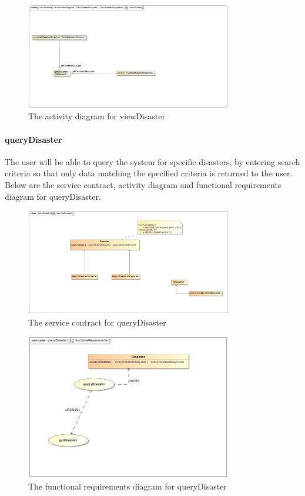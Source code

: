 \begin{figure}[ht!]
\centering
\includegraphics[width=90mm]{../images/viewDisasterActivityDiagram.jpg}
\caption{The activity diagram for viewDisaster \label{overflow}}
\end{figure}

\paragraph{queryDisaster}

The user will be able to query the system for specific disasters, by entering search criteria so that only data matching the specified criteria is returned to the user. Below are the service contract, activity diagram and functional requirements diagram for queryDisaster.

 \begin{figure}[ht!]
	\centering
	\includegraphics[width=90mm]{../images/queryDisasterServiceContract.jpg}
	\caption{The service contract for queryDisaster \label{overflow}}
\end{figure}

\begin{figure}[ht!]
\centering
\includegraphics[width=90mm]{../images/queryDisasterFunctionalRequirements.jpg}
\caption{The functional requirements diagram for queryDisaster \label{overflow}}
\end{figure}

